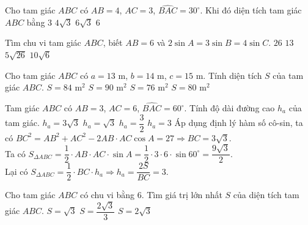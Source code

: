 	\begin{ex}%
	Cho tam giác $ABC$ có $AB=4$, $AC=3$, $\widehat{BAC}=30^\circ$. Khi đó diện tích tam giác $ABC$ bằng
	\choice
	{\True $3$}
	{$4\sqrt{3}$}
	{$6\sqrt{3}$}
	{$6$}
\end{ex}
\begin{ex}%
	Tìm chu vi tam giác $ABC$, biết $AB=6$ và $2\sin A=3\sin B=4\sin C$.
	\choice
	{\True $26$}
	{$13$}
	{$5\sqrt{26}$}
	{$10\sqrt{6}$}
\end{ex}
\begin{ex}%
	Cho tam giác $ABC$ có $a=13$ m, $b= 14$ m, $c=15$ m. Tính diện tích $S$ của tam giác $ABC$.
	\choice
	{\True $S= 84$ m$^2$}
	{$S= 90$ m$^2$}
	{$S= 76$ m$^2$}
	{$S= 80$ m$^2$}
\end{ex}

\begin{ex}%
	Tam giác $ ABC$ có $ AB=3$, $AC=6$, $\widehat{BAC}=60^\circ $. Tính độ dài đường cao $ h_a$ của tam giác.
	\choice
	{$ h_a=3\sqrt{3}$}
	{$ h_a=\sqrt{3}$}
	{$ h_a=\dfrac{3}{2}$}
	{\True $ h_a=3$}
	\loigiai
	{Áp dụng định lý hàm số cô-sin, ta có
		$ BC^2=AB^2+AC^2-2AB\cdot AC\cos A=27\Rightarrow BC=3\sqrt{3}$.\\
		Ta có $ S_{\Delta ABC}=\dfrac{1}{2}\cdot AB\cdot AC\cdot \sin{A}=\dfrac{1}{2}\cdot 3\cdot 6\cdot \sin 60^\circ=\dfrac{9\sqrt{3}}{2}$.\\
		Lại có $ S_{\Delta ABC}=\dfrac{1}{2}\cdot BC\cdot h_a\Rightarrow h_a=\dfrac{2S}{BC}=3$.}
\end{ex}

\begin{ex}%
	Cho tam giác $ABC$ có chu vi bằng $6$. Tìm giá trị lớn nhất $S$ của diện tích tam giác $ABC$.
	{\True $S=\sqrt{3}$}
	{$S=\dfrac{2\sqrt{3}}{3}$}
	{$S=2\sqrt{3}$}
\end{ex}

